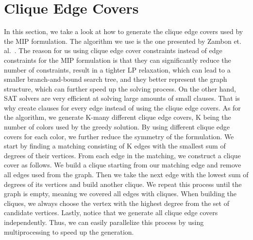 \section{Clique Edge Covers}

In this section, we take a look at how to generate the clique edge covers used by the MIP formulation. The algorithm we use is the one presented by Zambon et. al.~\cite{zambon2014exact}. The reason for us using clique edge cover constraints instead of edge constraints for the MIP formulation is that they can significantly reduce the number of constraints, result in a tighter LP relaxation, which can lead to a smaller branch-and-bound search tree, and they better represent the graph structure, which can further speed up the solving process. On the other hand, SAT solvers are very efficient at solving large amounts of small clauses. That is why create clauses for every edge instead of using the clique edge covers. 
As for the algorithm, we generate K-many different clique edge covers, K being the number of colors used by the greedy solution. By using different clique edge covers for each color, we further reduce the symmetry of the formulation. We start by finding a matching consisting of K edges with the smallest sum of degrees of their vertices. From each edge in the matching, we construct a clique cover as follows. We build a clique starting from our matching edge and remove all edges used from the graph. Then we take the next edge with the lowest sum of degrees of its vertices and build another clique. We repeat this process until the graph is empty, meaning we covered all edges with cliques. When building the cliques, we always choose the vertex with the highest degree from the set of candidate vertices. Lastly, notice that we generate all clique edge covers independently. Thus, we can easily parallelize this process by using multiprocessing to speed up the generation.

